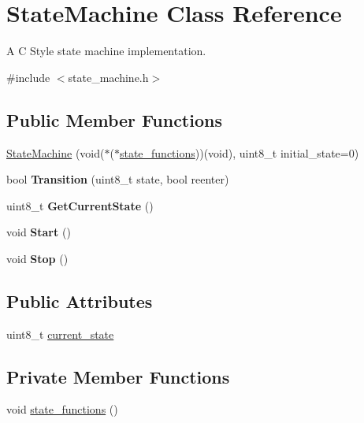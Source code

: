 \hypertarget{class_state_machine}{}\section{State\+Machine Class Reference}
\label{class_state_machine}


A C Style state machine implementation.  




{\ttfamily \#include $<$state\+\_\+machine.\+h$>$}

\subsection*{Public Member Functions}
\begin{DoxyCompactItemize}
\item 
\hyperlink{class_state_machine_ad9c6bdaca444710f77fc12d7e1af8fdc}{State\+Machine} (void($\ast$($\ast$\hyperlink{class_state_machine_acc87359cd98c436f5b891ffe6cb67160}{state\+\_\+functions}))(void), uint8\+\_\+t initial\+\_\+state=0)
\item 
\hypertarget{class_state_machine_a1597799edc5a89006f164e52fd72d02b}{}\label{class_state_machine_a1597799edc5a89006f164e52fd72d02b} 
bool {\bfseries Transition} (uint8\+\_\+t state, bool reenter)
\item 
\hypertarget{class_state_machine_a62fd24666d16a2425c8397ce2d326dae}{}\label{class_state_machine_a62fd24666d16a2425c8397ce2d326dae} 
uint8\+\_\+t {\bfseries Get\+Current\+State} ()
\item 
\hypertarget{class_state_machine_a94c93f8203bab4f5a3784eba7445b582}{}\label{class_state_machine_a94c93f8203bab4f5a3784eba7445b582} 
void {\bfseries Start} ()
\item 
\hypertarget{class_state_machine_a2eb142249e4c483c8a329b1a18b4383f}{}\label{class_state_machine_a2eb142249e4c483c8a329b1a18b4383f} 
void {\bfseries Stop} ()
\end{DoxyCompactItemize}
\subsection*{Public Attributes}
\begin{DoxyCompactItemize}
\item 
uint8\+\_\+t \hyperlink{class_state_machine_abdcd9426d9a2ec9e2d703c74cd3299df}{current\+\_\+state}
\end{DoxyCompactItemize}
\subsection*{Private Member Functions}
\begin{DoxyCompactItemize}
\item 
void \hyperlink{class_state_machine_acc87359cd98c436f5b891ffe6cb67160}{state\+\_\+functions} ()
\end{DoxyCompactItemize}
